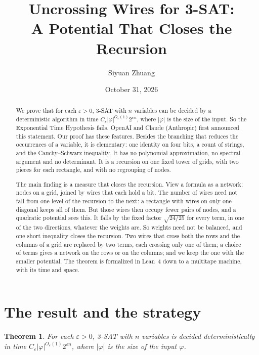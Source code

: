 \documentclass[11pt]{article}
\title{Uncrossing Wires for 3-SAT:\\A Potential That Closes the Recursion}
\author{Siyuan Zhuang}
\date{October 31, 2026}
\newtheorem{theorem}{Theorem}
\begin{document}
\maketitle

\begin{abstract}
We prove that for each $\varepsilon>0$, 3-SAT with $n$ variables can be decided by a deterministic algorithm in time $C_\varepsilon|\varphi|^{O_\varepsilon(1)}2^{\varepsilon n}$, where $|\varphi|$ is the size of the input. So the Exponential Time Hypothesis fails. OpenAI and Claude (Anthropic) first announced this statement. Our proof has these features. Besides the branching that reduces the occurrences of a variable, it is elementary: one identity on four bits, a count of strings, and the Cauchy--Schwarz inequality. It has no polynomial approximation, no spectral argument and no determinant. It is a recursion on one fixed tower of grids, with two pieces for each rectangle, and with no regrouping of nodes.

The main finding is a measure that closes the recursion. View a formula as a network: nodes on a grid, joined by wires that each hold a bit. The number of wires need not fall from one level of the recursion to the next: a rectangle with wires on only one diagonal keeps all of them. But those wires then occupy fewer pairs of nodes, and a quadratic potential sees this. It falls by the fixed factor $\sqrt{24/25}$ for every term, in one of the two directions, whatever the weights are. So weights need not be balanced, and one short inequality closes the recursion. Two wires that cross both the rows and the columns of a grid are replaced by two terms, each crossing only one of them; a choice of terms gives a network on the rows or on the columns; and we keep the one with the smaller potential. The theorem is formalized in Lean~4 down to a multitape machine, with its time and space.
\end{abstract}

\section*{The result and the strategy}

\begin{theorem}\label{thm:sat}
For each $\varepsilon>0$, 3-SAT with $n$ variables is decided deterministically in time $C_\varepsilon|\varphi|^{O_\varepsilon(1)}2^{\varepsilon n}$, where $|\varphi|$ is the size of the input $\varphi$.
\end{theorem}
\end{document}
